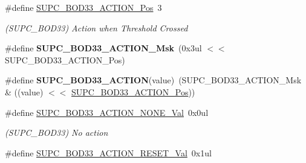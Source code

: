 \begin{DoxyCompactItemize}
\item 
\hypertarget{group___s_a_m_l21___s_u_p_c_ga8e1dbd232c21c8618d6ee2ea49c093ad}{}\#define \hyperlink{group___s_a_m_l21___s_u_p_c_ga8e1dbd232c21c8618d6ee2ea49c093ad}{S\+U\+P\+C\+\_\+\+B\+O\+D33\+\_\+\+A\+C\+T\+I\+O\+N\+\_\+\+Pos}~3\label{group___s_a_m_l21___s_u_p_c_ga8e1dbd232c21c8618d6ee2ea49c093ad}

\begin{DoxyCompactList}\small\item\em (S\+U\+P\+C\+\_\+\+B\+O\+D33) Action when Threshold Crossed \end{DoxyCompactList}\item 
\hypertarget{group___s_a_m_l21___s_u_p_c_ga44ce373b3a66b6d4afd392e75d4d8650}{}\#define {\bfseries S\+U\+P\+C\+\_\+\+B\+O\+D33\+\_\+\+A\+C\+T\+I\+O\+N\+\_\+\+Msk}~(0x3ul $<$$<$ S\+U\+P\+C\+\_\+\+B\+O\+D33\+\_\+\+A\+C\+T\+I\+O\+N\+\_\+\+Pos)\label{group___s_a_m_l21___s_u_p_c_ga44ce373b3a66b6d4afd392e75d4d8650}

\item 
\hypertarget{group___s_a_m_l21___s_u_p_c_ga8d669801950011ea112f5990a13afe1f}{}\#define {\bfseries S\+U\+P\+C\+\_\+\+B\+O\+D33\+\_\+\+A\+C\+T\+I\+O\+N}(value)~(S\+U\+P\+C\+\_\+\+B\+O\+D33\+\_\+\+A\+C\+T\+I\+O\+N\+\_\+\+Msk \& ((value) $<$$<$ \hyperlink{group___s_a_m_l21___s_u_p_c_ga8e1dbd232c21c8618d6ee2ea49c093ad}{S\+U\+P\+C\+\_\+\+B\+O\+D33\+\_\+\+A\+C\+T\+I\+O\+N\+\_\+\+Pos}))\label{group___s_a_m_l21___s_u_p_c_ga8d669801950011ea112f5990a13afe1f}

\item 
\hypertarget{group___s_a_m_l21___s_u_p_c_gafc3d193080f968fdcb16a5f927097593}{}\#define \hyperlink{group___s_a_m_l21___s_u_p_c_gafc3d193080f968fdcb16a5f927097593}{S\+U\+P\+C\+\_\+\+B\+O\+D33\+\_\+\+A\+C\+T\+I\+O\+N\+\_\+\+N\+O\+N\+E\+\_\+\+Val}~0x0ul\label{group___s_a_m_l21___s_u_p_c_gafc3d193080f968fdcb16a5f927097593}

\begin{DoxyCompactList}\small\item\em (S\+U\+P\+C\+\_\+\+B\+O\+D33) No action \end{DoxyCompactList}\item 
\hypertarget{group___s_a_m_l21___s_u_p_c_gab8c0721cf662d300e2a5acb1d517a1d4}{}\#define \hyperlink{group___s_a_m_l21___s_u_p_c_gab8c0721cf662d300e2a5acb1d517a1d4}{S\+U\+P\+C\+\_\+\+B\+O\+D33\+\_\+\+A\+C\+T\+I\+O\+N\+\_\+\+R\+E\+S\+E\+T\+\_\+\+Val}~0x1ul\label{group___s_a_m_l21___s_u_p_c_gab8c0721cf662d300e2a5acb1d517a1d4}


\end{DoxyCompactItemize}
